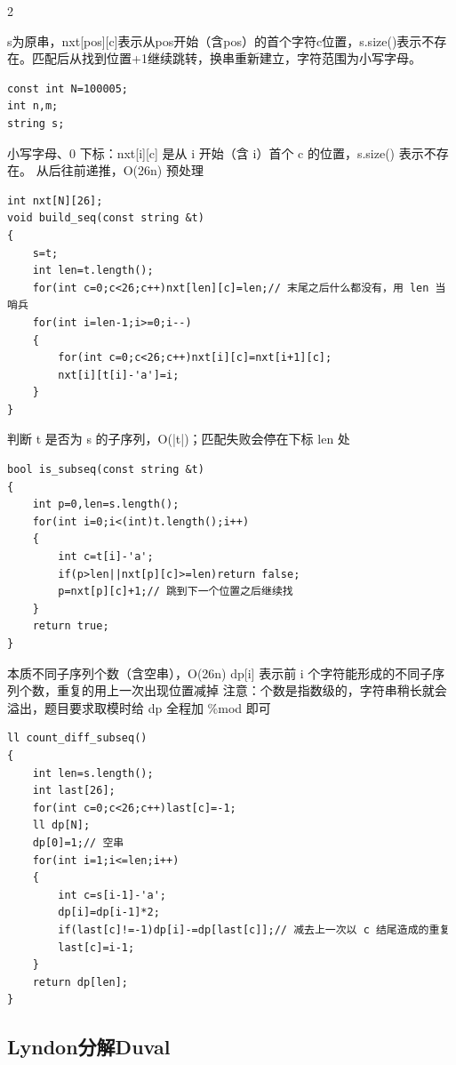\documentclass[UTF8,fontset=fandol,a4paper,twoside]{ctexart}
\newcommand{\note}[1]{{\fontsize{10}{12}\selectfont #1\par}}
\begin{document}
\begin{multicols}{2}
\note{s为原串，nxt[\allowbreak{}pos]\allowbreak{}[\allowbreak{}c]\allowbreak{}表示从pos开始（含pos）的首个字符c位置，s.\allowbreak{}size(\allowbreak{})\allowbreak{}表示不存在。匹配后从找到位置+\allowbreak{}1继续跳转，换串重新建立，字符范围为小写字母。}
\begin{lstlisting}
const int N=100005;
int n,m;
string s;
\end{lstlisting}
\note{小写字母、0 下标：nxt[\allowbreak{}i]\allowbreak{}[\allowbreak{}c]\allowbreak{} 是从 i 开始（含 i）首个 c 的位置，s.\allowbreak{}size(\allowbreak{})\allowbreak{} 表示不存在。 从后往前递推，O(\allowbreak{}26n)\allowbreak{} 预处理}
\begin{lstlisting}
int nxt[N][26];
void build_seq(const string &t)
{
    s=t;
    int len=t.length();
    for(int c=0;c<26;c++)nxt[len][c]=len;// 末尾之后什么都没有，用 len 当哨兵
    for(int i=len-1;i>=0;i--)
    {
        for(int c=0;c<26;c++)nxt[i][c]=nxt[i+1][c];
        nxt[i][t[i]-'a']=i;
    }
}
\end{lstlisting}
\note{判断 t 是否为 s 的子序列，O(\allowbreak{}|t|)\allowbreak{}；匹配失败会停在下标 len 处}
\begin{lstlisting}
bool is_subseq(const string &t)
{
    int p=0,len=s.length();
    for(int i=0;i<(int)t.length();i++)
    {
        int c=t[i]-'a';
        if(p>len||nxt[p][c]>=len)return false;
        p=nxt[p][c]+1;// 跳到下一个位置之后继续找
    }
    return true;
}
\end{lstlisting}
\note{本质不同子序列个数（含空串），O(\allowbreak{}26n)\allowbreak{} dp[\allowbreak{}i]\allowbreak{} 表示前 i 个字符能形成的不同子序列个数，重复的用上一次出现位置减掉 注意：个数是指数级的，字符串稍长就会溢出，题目要求取模时给 dp 全程加 \%mod 即可}
\begin{lstlisting}
ll count_diff_subseq()
{
    int len=s.length();
    int last[26];
    for(int c=0;c<26;c++)last[c]=-1;
    ll dp[N];
    dp[0]=1;// 空串
    for(int i=1;i<=len;i++)
    {
        int c=s[i-1]-'a';
        dp[i]=dp[i-1]*2;
        if(last[c]!=-1)dp[i]-=dp[last[c]];// 减去上一次以 c 结尾造成的重复
        last[c]=i-1;
    }
    return dp[len];
}
\end{lstlisting}
\subsection{Lyndon分解Duval}


\end{multicols}
\end{document}
